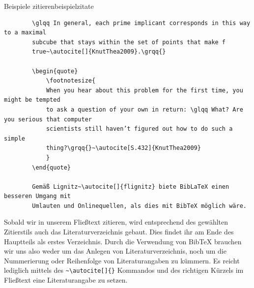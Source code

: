 \begin{code}{Beispiele zitieren}{beispielzitate}
	\begin{verbatim}
		\glqq In general, each prime implicant corresponds in this way to a maximal
		subcube that stays within the set of points that make f
		true~\autocite[]{KnutThea2009}.\grqq{}
		
		\begin{quote}
			\footnotesize{	
			When you hear about this problem for the first time, you might be tempted
			to ask a question of your own in return: \glqq What? Are you serious that computer
			scientists still haven’t figured out how to do such a simple
			thing?\grqq{}~\autocite[S.432]{KnutThea2009}
			}
		\end{quote}
		
		Gemäß Lignitz~\autocite[]{flignitz} biete BibLaTeX einen besseren Umgang mit
		Umlauten und Onlinequellen, als dies mit BibTeX möglich wäre.	
	\end{verbatim}
\end{code}

Sobald wir in unserem Fließtext zitieren, wird entsprechend des gewählten
Zitierstils auch das Literaturverzeichnis gebaut. Dies findet ihr am Ende des
Hauptteils als erstes Verzeichnis. Durch die Verwendung von BibTeX brauchen wir 
uns also weder um das Anlegen von Literaturverzeichnis, noch um die Nummerierung
oder Reihenfolge von Literaturangaben zu kümmern. Es reicht lediglich mittels des 
\texttt{\textasciitilde\textbackslash autocite[]\{\}} Kommandos und des richtigen
Kürzels im Fließtext eine Literaturangabe zu setzen. 


